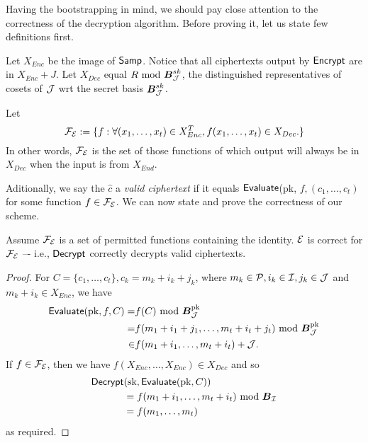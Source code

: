 Having the bootstrapping in mind, we should pay close attention to the correctness of the decryption algorithm. Before proving it, let us state few definitions first.

\begin{definition}
	Let $X_{Enc}$ be the image of $\textsf{Samp}$. Notice that all ciphertexts output by $\textsf{Encrypt}$ are in $X_{Enc} + J$. Let $X_{Dec}$ equal $R \text{ mod } \boldsymbol{B}^{sk}_{\mathcal{J}}$, the distinguished representatives of cosets of $\mathcal{J}$ wrt the secret basis $\boldsymbol{B}^{sk}_{\mathcal{J}}$.
\end{definition}

\begin{definition}
	Let
	\[ \mathcal{F}_{\mathcal{E}} := \{ f : \forall (x_1, \ldots, x_t) \in X_{Enc}^T, f(x_1, \ldots, x_t) \in X_{Dec}. \} \]
	In other words, $\mathcal{F}_{\mathcal{E}}$ is the set of those functions of which output will always be in $X_{Dec}$ when the input is from $X_{End}$.
\end{definition}
Aditionally, we say the $\hat{c}$ a \textit{valid ciphertext} if it equals $\textsf{Evaluate}$(pk, $f, (c_1, \ldots, c_t)$ for some function $f \in \mathcal{F}_{\mathcal{E}}$. We can now state and prove the correctness of our scheme.
\begin{theorem}[Correctness]
	Assume $\mathcal{F}_{\mathcal{E}}$ is a set of permitted functions containing the identity. $\mathcal{E}$ is correct for $\mathcal{F}_{\mathcal{E}}$ –- i.e., $\textsf{Decrypt}$ correctly decrypts valid ciphertexts.
\end{theorem}
\begin{proof}
	For $C = \{c_1, \ldots, c_t\}, c_k = m_k +i_k +j_k$, where $m_k \in \mathcal{P}, i_k \in \mathcal{I}, j_k \in \mathcal{J}$ and $m_k +i_k \in X_{Enc}$, we have
	\begin{align*}
		\textsf{Evaluate}(\text{pk}, f, C) = & f(C) \text{ mod } \boldsymbol{B}_{\mathcal{J}}^{\text{pk}} \\
		= & f(m_1 +i_1 +j_1, \ldots, m_t+i_t+j_t) \text{ mod } \boldsymbol{B}_{\mathcal{J}}^{\text{pk}} \\	
		\in & f(m_1 +i_1, \ldots, m_t +i_t) + \mathcal{J}.
	\end{align*}
	If $f \in \mathcal{F}_{\mathcal{E}}$, then we have $f(X_{Enc}, \ldots, X_{Enc}) \in X_{Dec}$ and so
	\begin{align*}
		\textsf{Decrypt} & (\text{sk}, \textsf{Evaluate}(\text{pk}, C)) \\
		& = f(m_1+i_1, \ldots, m_t +i_t) \text{ mod } \boldsymbol{B}_{\mathcal{I}} \\
		& = f(m_1, \ldots, m_t)
	\end{align*}
	as required.
\end{proof}

